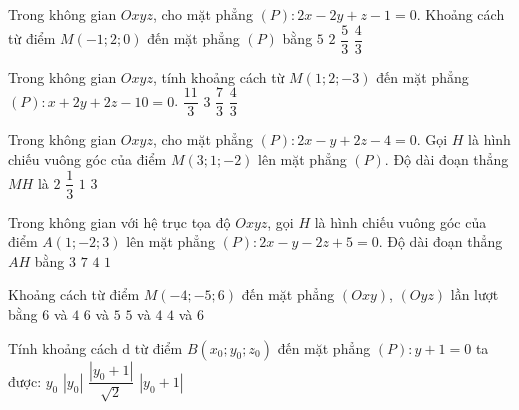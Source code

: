 \begin{ex}%
	Trong không gian $Oxyz$, cho mặt phẳng $(P)\colon 2x-2y+z-1=0$. Khoảng cách từ điểm $M\left(-1;2;0\right)$ đến mặt phẳng $(P)$ bằng
\choice
{$5$}
{$2$}
{\True $\dfrac{5}{3}$}
{$\dfrac{4}{3}$}
\end{ex}

\begin{ex}%
	Trong không gian $Oxyz$, tính khoảng cách từ $M\left(1;2;-3\right)$ đến mặt phẳng $(P)\colon x+2y+2z-10=0$.
\choice
{\True $\dfrac{11}{3}$}
{$3$}
{$\dfrac{7}{3}$}
{$\dfrac{4}{3}$}
\end{ex}

\begin{ex}%
	Trong không gian $Oxyz$, cho mặt phẳng $(P)\colon 2x-y+2z-4=0$. Gọi $H$ là hình chiếu vuông góc của điểm $M\left(3;1;-2\right)$ lên mặt phẳng $(P)$. Độ dài đoạn thẳng $MH$ là
\choice
{$2$}
{$\dfrac{1}{3}$}
{\True $1$}
{$3$}
\end{ex}

\begin{ex}%
	Trong không gian với hệ trục tọa độ $Oxyz$, gọi $H$ là hình chiếu vuông góc của điểm $A(1;-2;3)$ lên mặt phẳng $(P)\colon 2x-y-2z+5=0$. Độ dài đoạn thẳng $AH$ bằng
\choice
{$3$}
{$7$}
{$4$}
{$1$}
\end{ex}

\begin{ex}%
	Khoảng cách từ điểm $M(-4;-5;6)$ đến mặt phẳng $(Oxy)$, $(Oyz)$ lần lượt bằng
\choice
{\True $6$ và $4$}
{$6$ và $5$}
{$5$ và $4$}
{$4$ và $6$}
\end{ex}

\begin{ex}%
	Tính khoảng cách $\mathrm{d}$ từ điểm $B\left(x_0;y_0;z_0\right)$ đến mặt phẳng $(P)\colon y + 1 = 0$ ta được:
\choice
{$y_0$}
{$\left| y_0\right|$}
{$\dfrac{\left| y_0+1\right|}{\sqrt{2}}$}
{\True $\left| y_0+1\right|$}
\end{ex}

